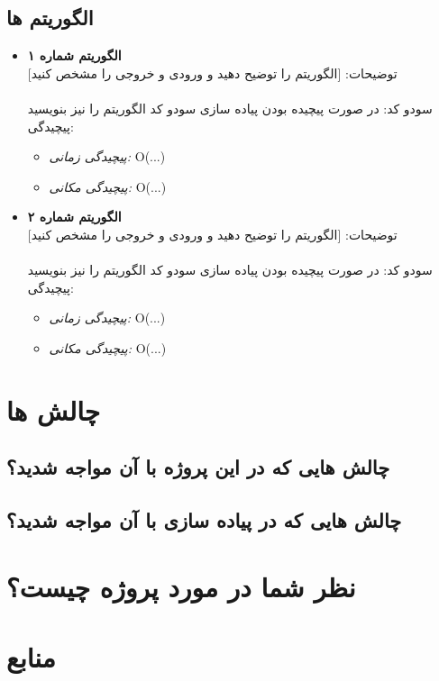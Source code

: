 \documentclass[12pt]{article}
\begin{document}
\subsection{الگوریتم ها}
\begin{itemize}[noitemsep]
	\item \textbf{الگوریتم شماره ۱}\\
	توضیحات: [الگوریتم را توضیح دهید و ورودی و خروجی را مشخص کنید]\\
	\lipsum[9]
	\\[0.2cm]
	سودو کد:
	در صورت پیچیده بودن پیاده سازی سودو کد الگوریتم را نیز بنویسید\\[0.2cm]
	پیچیدگی:
	\begin{itemize}[noitemsep]
		\item \textit{پیچیدگی زمانی:} O(...)
		\item \textit{پیچیدگی مکانی:} O(...)
	\end{itemize}		
	\item \textbf{الگوریتم شماره ۲}\\
	توضیحات: [الگوریتم را توضیح دهید و ورودی و خروجی را مشخص کنید]\\
	\lipsum[9]
	\\[0.2cm]
	سودو کد:
	در صورت پیچیده بودن پیاده سازی سودو کد الگوریتم را نیز بنویسید\\[0.2cm]
	پیچیدگی:
	\begin{itemize}[noitemsep]
		\item \textit{پیچیدگی زمانی:} O(...)
		\item \textit{پیچیدگی مکانی:} O(...)
	\end{itemize}
\end{itemize}

\newpage

\section{چالش ها}
\subsection{چالش هایی که در این پروژه با آن مواجه شدید؟}
\lipsum[2]
\subsection{چالش هایی که در پیاده سازی با آن مواجه شدید؟}
\lipsum[1]

\newpage

\section{نظر شما در مورد پروژه چیست؟}
\lipsum[3]
\newpage

\section{منابع}

\lipsum[4]


	
\end{document}
